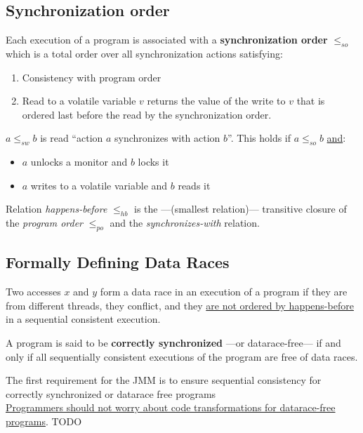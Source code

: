 \subsection{Synchronization order}
{Each execution of a program is associated with a \textbf{synchronization order} $\leq_{so}$ which is a total order over all synchronization actions satisfying:\ns
\begin{enumerate}
   \item Consistency with program order
   \item Read to a volatile variable $v$ returns the value of the write to $v$ that is ordered last before the read by the synchronization order.
\end{enumerate}}

{$a \leq_{sw} b$ is read ``action $a$ synchronizes with action $b$''. This holds if $a \leq_{so} b$ \ul{and}:\ns
\begin{itemize}
   \item $a$ unlocks a monitor and $b$ locks it
   \item $a$ writes to a volatile variable and $b$ reads it
\end{itemize}
}

Relation \textit{happens-before} $\leq_{hb}$ is the ---(smallest relation)--- transitive closure of the \textit{program order} $\leq_{po}$ and the \textit{synchronizes-with} relation.
\subsection{Formally Defining Data Races}
\begin{definition}
   Two accesses $x$ and $y$ form a data race in an execution of a program if they are from different threads, they conflict, and they \ul{are not ordered by happens-before} in a sequential consistent execution.
\end{definition}

A program is said to be \textbf{correctly synchronized} ---or datarace-free--- if and only if all sequentially consistent executions of the program are free of data races.

The first requirement for the JMM is to ensure sequential consistency for correctly synchronized or datarace free programs\\
\ul{Programmers should not worry about code transformations for datarace-free programs}.
TODO

